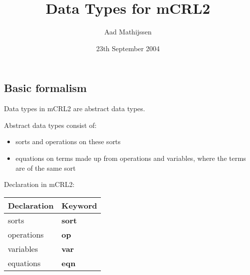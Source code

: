 \documentclass{article}
\title{\Huge Data Types for mCRL2}
\author{\Large Aad Mathijssen}
\date{\large 23th September 2004}
\newcommand{\kwsort}{{\bf sort}}
\newcommand{\kwop}{{\bf op}}
\newcommand{\kwvar}{{\bf var}}
\newcommand{\kweqn}{{\bf eqn}}
\begin{document}
\begin{slide}
\maketitle
\end{slide}

\begin{slidetop}
\section*{Basic formalism}

Data types in mCRL2 are abstract data types.

\bigskip
Abstract data types consist of:
\begin{itemize}
\item sorts and operations on these sorts
\item equations on terms made up from operations and variables, where the terms are of the same sort
\end{itemize}

\bigskip
Declaration in mCRL2:
\begin{center}
\begin{tabular}{|l|l|}
\hline
Declaration            & Keyword\\\hline
sorts                  & \kwsort\\
operations             & \kwop\\
variables              & \kwvar\\
equations              & \kweqn\\\hline
\end{tabular}
\end{center}
\end{slidetop}
\end{document}
